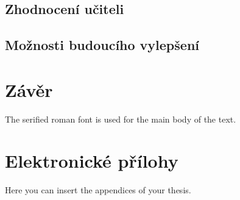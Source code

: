 \documentclass[
  digital,     %
  oneside,     %
  nosansbold,  %
  colorbold, %
  lof,         %
  nolot,         %
]{fithesis4}
\begin{document}
\section{Zhodnocení učiteli}

\section{Možnosti budoucího vylepšení}


\chapter{Závěr}
The serified roman font is used for the main body of the text.


\printbibliography[heading=bibintoc] %

  \makeatletter\thesis@blocks@clear\makeatother
  \printindex

\appendix %
\chapter{Elektronické přílohy}
Here you can insert the appendices of your thesis.
\end{document}
